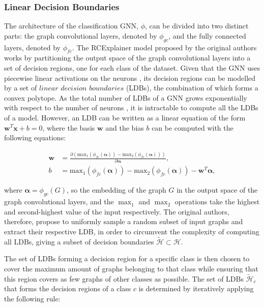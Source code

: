 \subsubsection{Linear Decision Boundaries}
The architecture of the classification GNN, $\phi$, can be divided into two distinct parts: the graph convolutional layers, denoted by $\phi_{gc}$, and the fully connected layers, denoted by $\phi_{fc}$.
The RCExplainer model proposed by the original authors works by partitioning the output space of the graph convolutional layers into a set of decision regions, one for each class of the dataset. Given that the GNN uses piecewise linear activations on the neurons \cite{adebayo2018}, its decision regions can be modelled by a set of $\textit{linear decision boundaries}$ (LDBs), the combination of which forms a convex polytope. As the total number of LDBs of a GNN grows exponentially with respect to the number of neurons \cite{montufar2014number}, it is intractable to compute all the LDBs of a model.
However, an LDB can be written as a linear equation of the form $\textbf{w}^{T}\textbf{x} + b = 0$, where the basis $\textbf{w}$ and the bias $b$ can be computed with the following equations:

\begin{align}
    \textbf{w} &= \frac{\partial \left(\text{max}_{1}(\phi_{fc}(\boldsymbol{\alpha})) - \text{max}_{2}(\phi_{fc}(\boldsymbol{\alpha}))\right)}{\partial \boldsymbol{\alpha}}, \\
    b &= \text{max}_{1}(\phi_{fc}(\boldsymbol{\alpha})) - \text{max}_{2}(\phi_{fc}(\boldsymbol{\alpha})) - \textbf{w}^{T}\boldsymbol{\alpha},
\end{align}

where $\boldsymbol{\alpha} = \phi_{gc}(G)$, so the embedding of the graph $G$ in the output space of the graph convolutional layers, and the $\max_{1}$ and $\max_{2}$ operations take the highest and second-highest value of the input respectively. The original authors, therefore, propose to uniformly sample a random subset of input graphs and extract their respective LDB, in order to circumvent the complexity of computing all LDBs, giving a subset of decision boundaries $\tilde{\mathcal{H}} \subset \mathcal{H}$. 

The set of LDBs forming a decision region for a specific class is then chosen to cover the maximum amount of graphs belonging to that class while ensuring that this region covers as few graphs of other classes as possible. 
The set of LDBs $\tilde{\mathcal{H}}_{c}$ that forms the decision regions of a class $c$ is determined by iteratively applying the following rule:

